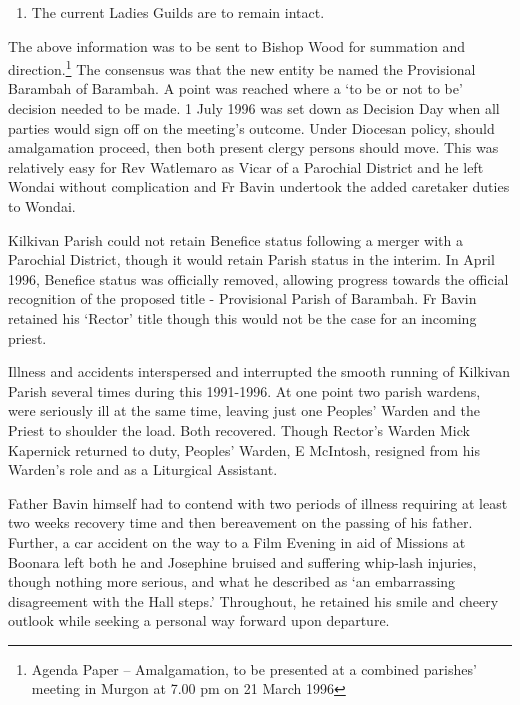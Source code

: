 \begin{enumerate}

\def\labelenumi{\arabic{enumi}.}

\setcounter{enumi}{5}

\item

  The current Ladies Guilds are to remain intact.

\end{enumerate}



The above information was to be sent to Bishop Wood for summation and direction.\footnote{Agenda Paper -- Amalgamation, to be presented at a combined parishes' meeting in Murgon at 7.00 pm on 21 March 1996} The consensus was that the new entity be named the Provisional Barambah of Barambah. A point was reached where a `to be or not to be' decision needed to be made. 1 July 1996 was set down as Decision Day when all parties would sign off on the meeting's outcome. Under Diocesan policy, should amalgamation proceed, then both present clergy persons should move. This was relatively easy for Rev Watlemaro as Vicar of a Parochial District and he left Wondai without complication and Fr Bavin undertook the added caretaker duties to Wondai.


Kilkivan Parish could not retain Benefice status following a merger with a Parochial District, though it would retain Parish status in the interim. In April 1996, Benefice status was officially removed, allowing progress towards the official recognition of the proposed title - Provisional Parish of Barambah. Fr Bavin retained his `Rector' title though this would not be the case for an incoming priest.



Illness and accidents interspersed and interrupted the smooth running of Kilkivan Parish several times during this 1991-1996. At one point two parish wardens, were seriously ill at the same time, leaving just one Peoples' Warden and the Priest to shoulder the load. Both recovered. Though Rector's Warden Mick Kapernick returned to duty, Peoples' Warden, E McIntosh, resigned from his Warden's role and as a Liturgical Assistant.



Father Bavin himself had to contend with two periods of illness requiring at least two weeks recovery time and then bereavement on the passing of his father. Further, a car accident on the way to a Film Evening in aid of Missions at Boonara left both he and Josephine bruised and suffering whip-lash injuries, though nothing more serious, and what he described as `an embarrassing disagreement with the Hall steps.' Throughout, he retained his smile and cheery outlook while seeking a personal way forward upon departure.



